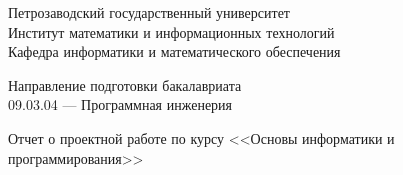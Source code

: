 \documentclass[a4paper,12pt]{article}
\renewcommand{\baselinestretch}{1.50}
\begin{document}

\thispagestyle{empty}
\begin{center}


    \renewcommand{\baselinestretch}{1}
    {\large
        {\sc Петрозаводский государственный университет\\
            Институт математики и информационных технологий\\
            Кафедра информатики и математического обеспечения
        }
    }

\end{center}


\begin{center}
    Направление подготовки бакалавриата \\
    09.03.04 --- Программная инженерия \\
\end{center}

\vfill

\begin{center}

    {\normalsize
        Отчет о проектной работе по курсу <<Основы информатики и программирования>>}
    \medskip

    {\Large {}} \\
\end{center}

\medskip
\end{document}
